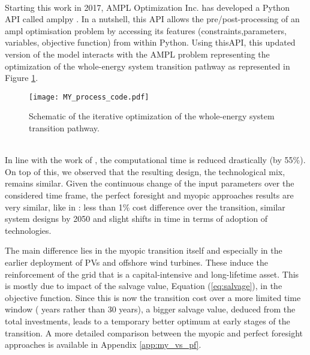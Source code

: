 \\

\noindent
Starting this work in 2017, AMPL Optimization Inc. has developed a Python \gls{API} called amplpy \cite{amplpy}. In a nutshell, this API allows the pre/post-processing of an ampl optimisation problem by accessing its features (\eg constraints,parameters, variables, objective function) from within Python. Using this\gls{API}, this updated version of the model interacts with the AMPL problem representing the optimization of the whole-energy system transition pathway as represented in Figure \ref{fig:MY_process_code}. 


\begin{figure}[htbp!]
\centering
\texttt{[image: MY\_process\_code.pdf]}
\caption{Schematic of the iterative optimization of the whole-energy system transition pathway.}
\label{fig:MY_process_code}
\end{figure}

\\

\noindent
In line with the work of \citet{babrowski2014reducing}, the computational time is reduced drastically (\ie by 55\%). On top of this, we observed that the resulting design, \ie the technological mix, remains similar.  Given the continuous change of the input parameters over the considered time frame, the perfect foresight and myopic approaches results are very similar, like in \cite{krey2006vergleich}: less than 1\% cost difference over the transition, similar system designs by 2050 and slight shifts in time in terms of adoption of technologies. 

The main difference lies in the myopic transition itself and especially in the earlier deployment of PVs and offshore wind turbines. These induce the reinforcement of the grid that is a capital-intensive and long-lifetime asset. This is mostly due to impact of the salvage value, Equation (\ref{eq:salvage}), in the objective function. Since this is now the transition cost over a more limited time window ( years rather than 30 years), a bigger salvage value, deduced from the total investments, leads to a temporary better optimum at early stages of the transition. A more detailed comparison between the myopic and perfect foresight approaches is available in Appendix \ref{app:my_vs_pf}.

